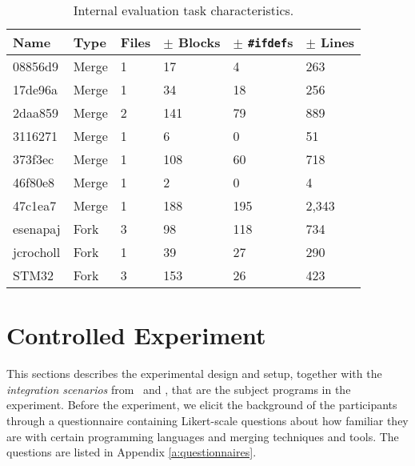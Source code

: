 \begin{table}[ht]
    \centering
    \caption{Internal evaluation task characteristics.}
    \label{tab:internalchar}
    \begin{tabular}{lll|lll}
\hline\hline
\textbf{Name} & \textbf{Type} & \textbf{Files} & \textbf{$\pm$ Blocks} & \textbf{$\pm$ \texttt{\#ifdef}s} & \textbf{$\pm$ Lines} \\
\hline
08856d9      & Merge     & 1 & 17    & 4     & 263   \\
17de96a      & Merge     & 1 & 34    & 18    & 256   \\
2daa859      & Merge     & 2 & 141 & 79      & 889   \\
3116271      & Merge     & 1 & 6     & 0     & 51    \\
373f3ec      & Merge     & 1 & 108 & 60      & 718   \\
46f80e8      & Merge     & 1 & 2     & 0     & 4     \\
47c1ea7      & Merge     & 1 & 188   & 195   & 2,343 \\
\hline
esenapaj     & Fork         & 3 & 98    & 118   & 734   \\
jcrocholl    & Fork         & 1 & 39    & 27    & 290   \\
STM32        & Fork         & 3 & 153   & 26    & 423   \\
\hline\hline
    \end{tabular}
\end{table}

\section{Controlled Experiment}
This sections describes the experimental design and setup, together with the \textit{integration scenarios} from \busybox~and \vim, that are the subject programs in the experiment. Before the experiment, we elicit the background of the participants through a questionnaire containing Likert-scale questions about how familiar they are with certain programming languages and merging techniques and tools. The questions are listed in Appendix \ref{a:questionnaires}.

\newcommand{\HA}{Integration in \tooln~is faster than in Eclipse CDT}
\newcommand{\HB}{Integration in \tooln~requires fewer edit operations than in Eclipse CDT}
\newcommand{\HC}{Integration in \tooln~leads to fewer defects than in Eclipse CDT}

